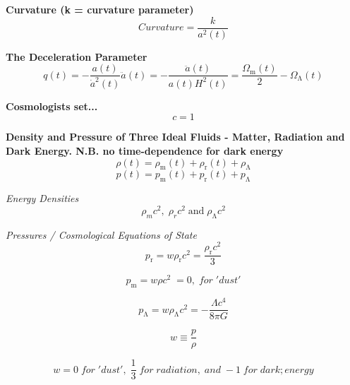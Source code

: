 \documentclass{spy}
\begin{document}
\textbf {Curvature (k = curvature parameter)}
\begin{equation}
Curvature = \frac {k}{a^2(t)}
\end{equation}

\textbf {The Deceleration Parameter}
\begin{equation}
q(t) = - \frac {a(t)}{\dot{a}^2(t)} \ddot{a}(t) = - \frac {\ddot{a}(t)}{a(t) H^2(t)} = \frac {\Omega_\mathrm{m}(t)}{2} - \Omega_\mathrm{\Lambda}(t)
\end{equation}

\textbf {Cosmologists set...}
\begin{equation}
c = 1
\end{equation}

\textbf {Density and Pressure of Three Ideal Fluids - Matter, Radiation and Dark Energy. N.B. no time-dependence for dark energy}
\begin{equation}
\rho(t) = \rho_\mathrm{m}(t) +  \rho_\mathrm{r}(t) + \rho_\mathrm{\Lambda}
\end{equation}
\begin{equation}
p(t) = p_\mathrm{m}(t) + p_\mathrm{r}(t) + p_\mathrm{\Lambda}
\end{equation}

\textit {Energy Densities}
\begin{equation}
\rho_m c^2 \mathrm{,} \; \rho_r c^2 \; \mathrm{and} \; \rho_\mathrm{\Lambda} c^2
\end{equation}

\textit {Pressures / Cosmological Equations of State}
\begin{equation}
p_\mathrm{r} = w \rho_\mathrm{r} c^2 = \frac {\rho_\mathrm{r} c^2}{3}
\end{equation}

\begin{equation}
p_\mathrm{m} = w \rho c^2 \; = 0, \; for \; 'dust'
\end{equation}

\begin{equation}
p_\mathrm{\Lambda} = w \rho_\mathrm{\Lambda}c^2 = - \frac {\Lambda c^4}{8 \pi G}
\end{equation}

\begin{equation}
w \equiv \frac {p}{\rho}
\end{equation}

\begin{equation}
w = 0 \; for \; 'dust', \; \frac {1}{3} \; for \; radiation, \; and \; -1 \; for \; dark ; energy
\end{equation}
\end{document}
